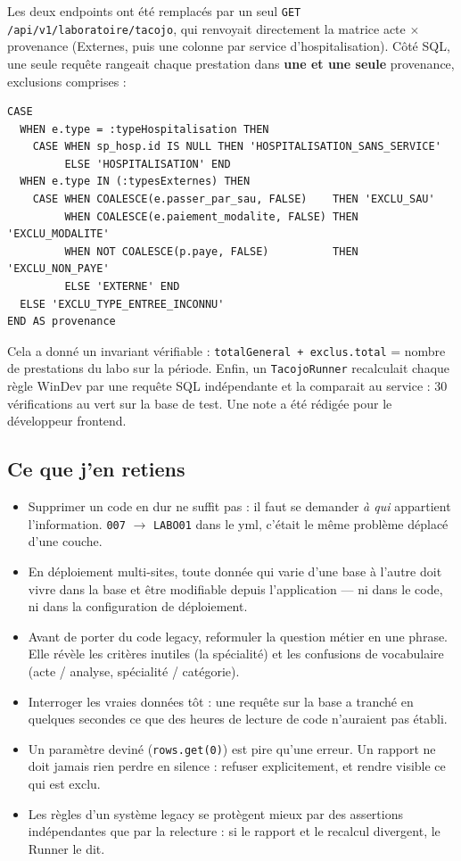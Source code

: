 \documentclass[10pt,twoside,openany]{article}
\begin{document}
Les deux endpoints ont été remplacés par un seul \texttt{GET /api/v1/laboratoire/tacojo}, qui renvoyait directement la matrice acte $\times$ provenance (Externes, puis une colonne par service d'hospitalisation). Côté SQL, une seule requête rangeait chaque prestation dans \textbf{une et une seule} provenance, exclusions comprises :

\begin{lstlisting}
CASE
  WHEN e.type = :typeHospitalisation THEN
    CASE WHEN sp_hosp.id IS NULL THEN 'HOSPITALISATION_SANS_SERVICE'
         ELSE 'HOSPITALISATION' END
  WHEN e.type IN (:typesExternes) THEN
    CASE WHEN COALESCE(e.passer_par_sau, FALSE)    THEN 'EXCLU_SAU'
         WHEN COALESCE(e.paiement_modalite, FALSE) THEN 'EXCLU_MODALITE'
         WHEN NOT COALESCE(p.paye, FALSE)          THEN 'EXCLU_NON_PAYE'
         ELSE 'EXTERNE' END
  ELSE 'EXCLU_TYPE_ENTREE_INCONNU'
END AS provenance
\end{lstlisting}

Cela a donné un invariant vérifiable : \texttt{totalGeneral + exclus.total} = nombre de prestations du labo sur la période. Enfin, un \texttt{TacojoRunner} recalculait chaque règle WinDev par une requête SQL indépendante et la comparait au service : 30 vérifications au vert sur la base de test. Une note a été rédigée pour le développeur frontend.

\subsection*{Ce que j'en retiens}
\begin{itemize}
  \item Supprimer un code en dur ne suffit pas : il faut se demander \textit{à qui} appartient l'information. \texttt{007} $\rightarrow$ \texttt{LABO01} dans le yml, c'était le même problème déplacé d'une couche.
  \item En déploiement multi-sites, toute donnée qui varie d'une base à l'autre doit vivre dans la base et être modifiable depuis l'application --- ni dans le code, ni dans la configuration de déploiement.
  \item Avant de porter du code legacy, reformuler la question métier en une phrase. Elle révèle les critères inutiles (la spécialité) et les confusions de vocabulaire (acte / analyse, spécialité / catégorie).
  \item Interroger les vraies données tôt : une requête sur la base a tranché en quelques secondes ce que des heures de lecture de code n'auraient pas établi.
  \item Un paramètre deviné (\texttt{rows.get(0)}) est pire qu'une erreur. Un rapport ne doit jamais rien perdre en silence : refuser explicitement, et rendre visible ce qui est exclu.
  \item Les règles d'un système legacy se protègent mieux par des assertions indépendantes que par la relecture : si le rapport et le recalcul divergent, le Runner le dit.
\end{itemize}
\end{document}
